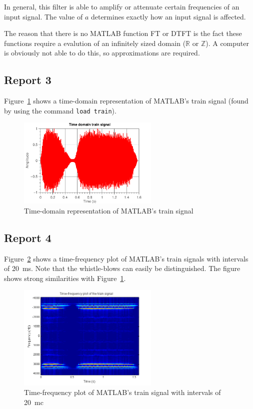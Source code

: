 \documentclass[11pt,titlepage]{report}
\begin{document}
In general, this filter is able to amplify or attenuate certain frequencies of an input signal. The value of $a$ determines exactly how an input signal is affected.

The reason that there is no MATLAB function FT or DTFT is the fact these functions require a evalution of an infinitely sized domain ($\mathbb{R}$ or $\mathbb{Z}$). A computer is obviously not able to do this, so approximations are required.

\subsection{Report 3}
Figure~\ref{fig:ass-1-rep-3} shows a time-domain representation of MATLAB's train signal (found by using the command \texttt{load train}).

\begin{figure}[H]
	\centering
	\includegraphics[width=0.6\textwidth]{../../deliverable-7-resources/figures/ass-1/report-3/ass-1-report-3.pdf}
	\caption{Time-domain representation of MATLAB's train signal}
	\label{fig:ass-1-rep-3}
\end{figure}

\subsection{Report 4}
Figure~\ref{fig:ass-1-rep-4} shows a time-frequency plot of MATLAB's train signals with intervals of \SI{20}{ms}. Note that the whistle-blows can easily be distinguished. The figure shows strong similarities with Figure~\ref{fig:ass-1-rep-3}. 

\begin{figure}[H]
	\centering
	\includegraphics[width=0.6\textwidth]{../../deliverable-7-resources/figures/ass-1/report-4/ass-1-report-4.png}
	\caption{Time-frequency plot of MATLAB's train signal with intervals of \SI{20}{mc}}
	\label{fig:ass-1-rep-4}
\end{figure}
\end{document}
